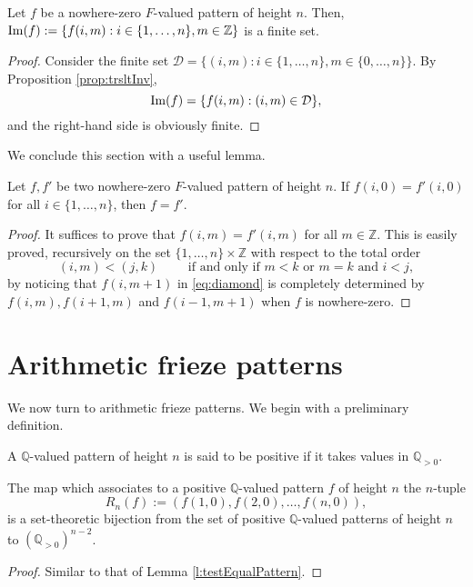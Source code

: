 \begin{corollary}
    \label{cor:imageFinite}
    Let $f$ be a nowhere-zero $F$-valued pattern of height $n$. Then, ${\rm Im}(f) := \{f (i,m) : i \in \{1,\ldots, n\}, m \in \mathbb{Z}\}$ is
    a finite set. 
\end{corollary}
\begin{proof}
    Consider the finite set $\mathcal{D} = \{(i,m) : i \in \{1,\ldots, n\}, m \in \{0,\ldots, n\}\}$. By Proposition \ref{prop:trsltInv}, 
    \[
        {\rm Im}(f) = \{f (i,m) : (i,m) \in \mathcal{D}\},
    \]
    and the right-hand side is obviously finite. 
\end{proof}

We conclude this section with a useful lemma.
\begin{lemma}
    \label{l:testEqualPattern}
    Let $f,f'$ be two nowhere-zero $F$-valued pattern of height $n$. If $f (i,0) = f' (i,0)$ for all $i \in \{1,\ldots, n\}$, then $f = f'$.
\end{lemma}
\begin{proof}
    It suffices to prove that $f (i,m) = f '(i,m)$ for all $m \in \mathbb{Z}$. This is easily proved, recursively on the set 
    $\{1,\ldots, n\} \times \mathbb{Z}$ with respect to the total order 
    \[
        (i,m) < (j,k) \qquad \text{ if and only if } m < k \text{ or } m=k \text{ and } i < j,
    \]
    by noticing that $f(i,m+1)$ in \eqref{eq:diamond} is completely determined by $f(i,m), f (i+1,m)$ and $f (i-1,m+1)$ when 
    $f$ is nowhere-zero.  
\end{proof}

\section{Arithmetic frieze patterns}
We now turn to arithmetic frieze patterns. We begin with a preliminary definition.

\begin{definition} 
    \label{def:positivePattern}
    A $\mathbb{Q}$-valued pattern of height $n$ is said to be positive if it takes values in $\mathbb{Q}_{>0}$.
\end{definition}


\begin{lemma}
    \label{l:positivePatternCharact}
    The map which associates to a positive $\mathbb{Q}$-valued pattern $f$ of height $n$ the $n$-tuple 
    \[
       R_n(f) :=  (f(1,0), f (2,0), \ldots, f(n,0)),
    \]
    is a set-theoretic bijection from the set of positive $\mathbb{Q}$-valued patterns of height $n$ to 
    $(\mathbb{Q}_{>0})^{n-2}$. 
\end{lemma}
\begin{proof}
    Similar to that of Lemma \ref{l:testEqualPattern}.
\end{proof}

